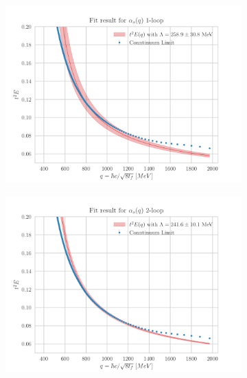 \begin{figure}[hbt!]
    \centering
    \begin{subfigure}{0.49\textwidth}
        \centering
        \includegraphics[width=1\textwidth]{results/End1.pdf}
    \end{subfigure}
    \begin{subfigure}{0.49\textwidth}
        \centering
        \includegraphics[width=1\textwidth]{results/End2.pdf}
    \end{subfigure}


\end{figure}
